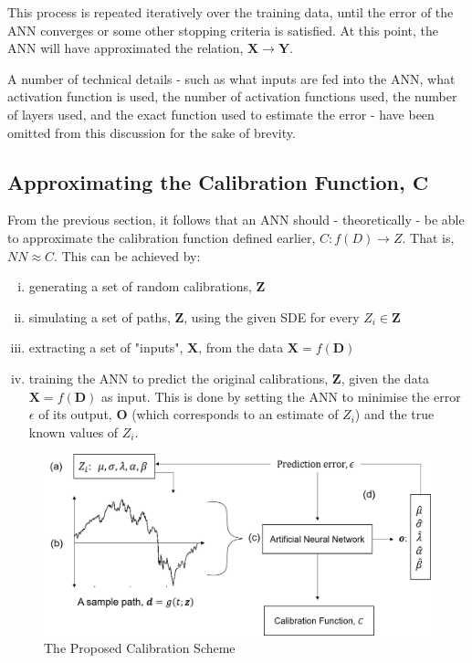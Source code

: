 \documentclass[11pt,oneside,openany,a4paper,english, report, goldenblock
]{usthesis}
\begin{document}
This process is repeated iteratively over the training data, until the error of the ANN converges or some other stopping criteria is satisfied. At this point, the ANN will have approximated the relation, $\mathbf{X}\rightarrow \mathbf{Y}$.


A number of technical details - such as what inputs are fed into the ANN, what activation function is used, the number of activation functions used, the number of layers used, and the exact function used to estimate the error - have been omitted from this discussion for the sake of brevity. 

\subsection{Approximating the Calibration Function, $\mathbf{C}$} \label{subsection:neural_networks:approximating_the_calibration_function_C}
From the previous section, it follows that an ANN should - theoretically - be able to approximate the calibration function defined earlier, $C: f \left( D \right) \rightarrow Z$. That is, $NN \approx C$.
This can be achieved by:
\begin{enumerate}[i)]
	\itemsep0em 
	
	\item generating a set of random calibrations, $\mathbf{Z}$
	
	\item simulating a set of paths,  $\mathbf{Z}$, using the given SDE for every  $Z_i \in \mathbf{Z}$
	
	\item extracting a set of "inputs", $\mathbf{X}$, from the data $\mathbf{X} = f\left(\mathbf{D}\right)$
	
	\item training the ANN to predict the original calibrations, $\mathbf{Z}$, given the data $\mathbf{X}=f \left( \mathbf{D} \right)$ as input. This is done by setting the ANN to minimise the error $\epsilon$ of its output, $\mathbf{O}$ (which corresponds to an estimate of $Z_i$) and the true known values of $Z_i$.
	
	
\end{enumerate}

\begin{figure}[h]
	\centering
	\includegraphics[width=1\linewidth]{Images/Diagrams/CalibrationSchemeDiagram}
	\caption[The Proposed Calibration Scheme]{The Proposed Calibration Scheme}
	\label{fig:calibrationschemediagram}
\end{figure}
\end{document}
